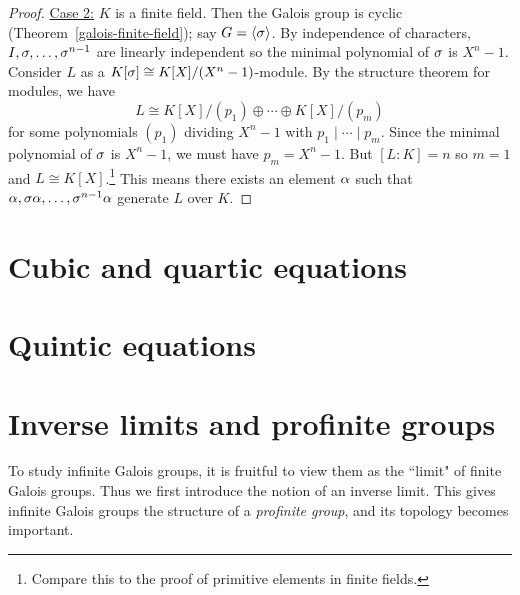 \begin{proof}
\noindent\underline{Case 2:} $K$ is a finite field. Then the Galois group is cyclic (Theorem~\ref{galois-finite-field}); say $G=\left\langle {\sigma}\right\rangle$. By independence of characters, $I, \sigma,\ldots, \sigma^{n-1}$ are linearly independent so the minimal polynomial of $\sigma$ is $X^n-1$. %
Consider $L$ as a $K[\sigma]\cong K[X]/(X^n-1)$-module. By the structure theorem for modules, we have
\[
L\cong K[X]/(p_1)\oplus \cdots\oplus K[X]/(p_m)
\]
for some polynomials $(p_1)$ dividing $X^n-1$ with $p_1\mid \cdots \mid p_m$. Since the minimal polynomial of $\sigma$ is $X^n-1$, we must have $p_m=X^n-1$. But $[L:K]=n$ so $m=1$ and $L\cong K[X]$.\footnote{Compare this to the proof of primitive elements in finite fields.} This means there exists an element $\alpha$ such that $\alpha, \sigma\alpha,\ldots, \sigma^{n-1}\alpha$ generate $L$ over $K$.
\end{proof}
\section{Cubic and quartic equations}
\section{Quintic equations}
\begin{thm}
\end{thm}
\section{Inverse limits and profinite groups}
To study infinite Galois groups, it is fruitful to view them as the ``limit" of finite Galois groups. Thus we first introduce the notion of an inverse limit. This gives infinite Galois groups the structure of a {\it profinite group}, and its topology becomes important.

